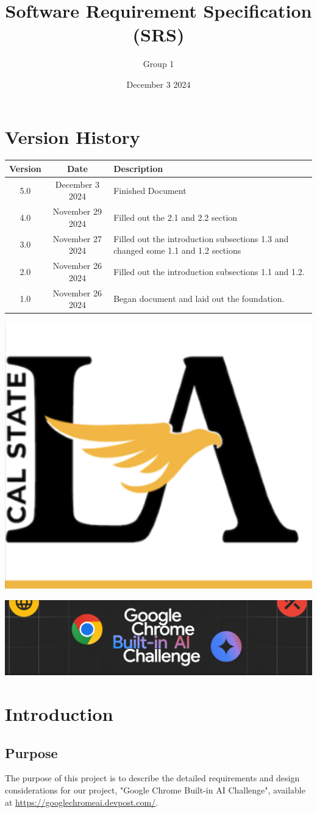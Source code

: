 \documentclass{article}
\title{Software Requirement Specification (SRS)}
\author{Group 1 }
\date{December 3 2024}
\begin{document}
\maketitle  
\pagebreak

\tableofcontents
\pagebreak

\section*{Version History}
\begin{longtable}{|c|c|p{10cm}|}
\hline
\textbf{Version} & \textbf{Date} & \textbf{Description} \\ \hline
5.0 & December 3 2024 & Finished Document \\ \hline
4.0 & November 29 2024 & Filled out the 2.1 and 2.2 section \\ \hline
3.0 & November 27 2024 & Filled out the introduction subsections 1.3 and changed some 1.1 and 1.2 sections \\ \hline
2.0 & November 26 2024 & Filled out the introduction subsections 1.1 and 1.2.  \\ \hline
1.0 & November 26 2024 & Began document and laid out the foundation.  \\ \hline
\end{longtable}
\pagebreak

\includegraphics[width=0.3\linewidth]{../logo/csula.png} 

\includegraphics[width=0.3\linewidth]{../logo/chromeai.png} 

\section{Introduction}
\subsection{Purpose}
The purpose of this project is to describe the detailed requirements and design considerations for our project, "Google Chrome Built-in AI Challenge", available at \url{https://googlechromeai.devpost.com/}.
\end{document}
